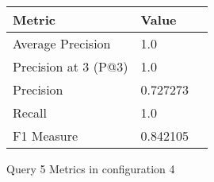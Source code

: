 \begin{figure}[H]
\begin{center}
\begin{tabular}{lll}
\toprule
{}                      Metric &         Value \\
\midrule
     Average Precision &       1.0 \\
  Precision at 3 (P@3) &       1.0 \\
             Precision &  0.727273 \\
                Recall &       1.0 \\
            F1 Measure &  0.842105 \\
\bottomrule
\end{tabular}
\end{center}
\caption{Query 5 Metrics in configuration 4}
\label{fig:query_5_metrics_config_4}
\end{figure}